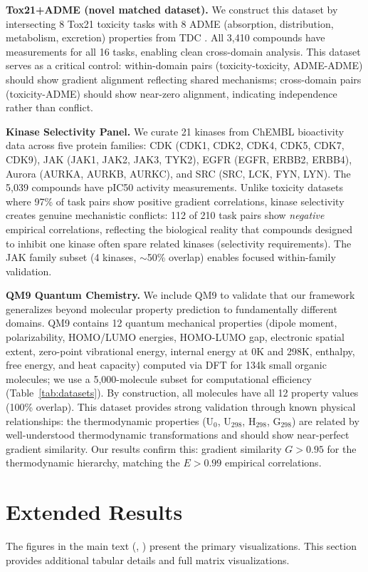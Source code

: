 \documentclass{article}
\begin{document}
\textbf{Tox21+ADME (novel matched dataset).} We construct this dataset by intersecting 8 Tox21 toxicity tasks with 8 ADME (absorption, distribution, metabolism, excretion) properties from TDC \citep{huang2021therapeutics}. All 3,410 compounds have measurements for all 16 tasks, enabling clean cross-domain analysis. This dataset serves as a critical control: within-domain pairs (toxicity-toxicity, ADME-ADME) should show gradient alignment reflecting shared mechanisms; cross-domain pairs (toxicity-ADME) should show near-zero alignment, indicating independence rather than conflict.

\textbf{Kinase Selectivity Panel.} We curate 21 kinases from ChEMBL \citep{gaulton2012chembl} bioactivity data across five protein families: CDK (CDK1, CDK2, CDK4, CDK5, CDK7, CDK9), JAK (JAK1, JAK2, JAK3, TYK2), EGFR (EGFR, ERBB2, ERBB4), Aurora (AURKA, AURKB, AURKC), and SRC (SRC, LCK, FYN, LYN). The 5,039 compounds have pIC50 activity measurements. Unlike toxicity datasets where 97\% of task pairs show positive gradient correlations, kinase selectivity creates genuine mechanistic conflicts: 112 of 210 task pairs show \textit{negative} empirical correlations, reflecting the biological reality that compounds designed to inhibit one kinase often spare related kinases (selectivity requirements). The JAK family subset (4 kinases, $\sim$50\% overlap) enables focused within-family validation.

\textbf{QM9 Quantum Chemistry.} We include QM9 to validate that our framework generalizes beyond molecular property prediction to fundamentally different domains. QM9 contains 12 quantum mechanical properties (dipole moment, polarizability, HOMO/LUMO energies, HOMO-LUMO gap, electronic spatial extent, zero-point vibrational energy, internal energy at 0K and 298K, enthalpy, free energy, and heat capacity) computed via DFT for 134k small organic molecules; we use a 5,000-molecule subset for computational efficiency (Table~\ref{tab:datasets}). By construction, all molecules have all 12 property values (100\% overlap). This dataset provides strong validation through known physical relationships: the thermodynamic properties (U$_0$, U$_{298}$, H$_{298}$, G$_{298}$) are related by well-understood thermodynamic transformations and should show near-perfect gradient similarity. Our results confirm this: gradient similarity $G > 0.95$ for the thermodynamic hierarchy, matching the $E > 0.99$ empirical correlations.

\section{Extended Results}
The figures in the main text (, ) present the primary visualizations. This section provides additional tabular details and full matrix visualizations.
\end{document}
